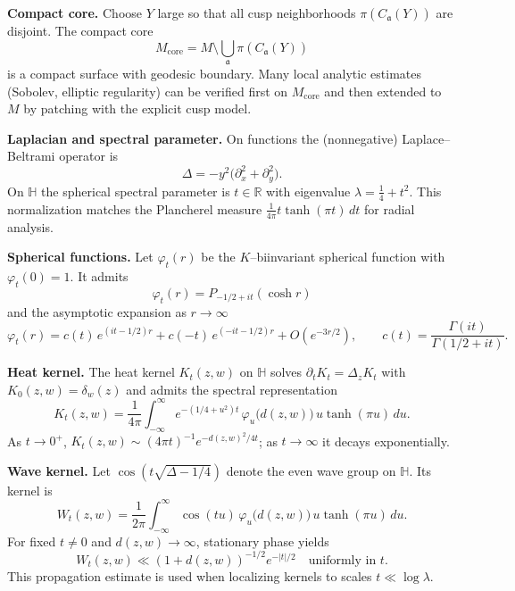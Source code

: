 \medskip

\noindent\textbf{Compact core.}
Choose $Y$ large so that all cusp neighborhoods $\pi(C_{\mathfrak{a}}(Y))$ are disjoint.
The compact core
\[
  M_{\mathrm{core}}=M\setminus\bigcup_{\mathfrak{a}}\pi(C_{\mathfrak{a}}(Y))
\]
is a compact surface with geodesic boundary. Many local analytic estimates
(Sobolev, elliptic regularity) can be verified first on $M_{\mathrm{core}}$ and then extended
to $M$ by patching with the explicit cusp model.


\noindent\textbf{Laplacian and spectral parameter.}
On functions the (nonnegative) Laplace–Beltrami operator is
\[
  \Delta=-y^{2}\bigl(\partial_{x}^{2}+\partial_{y}^{2}\bigr).
\]
On $\mathbb{H}$ the spherical spectral parameter is $t\in\mathbb{R}$ with eigenvalue
$\lambda=\tfrac14+t^{2}$. This normalization matches the Plancherel measure
$\tfrac{1}{4\pi}t\tanh(\pi t)\,dt$ for radial analysis.

\medskip

\noindent\textbf{Spherical functions.}
Let $\varphi_{t}(r)$ be the $K$–biinvariant spherical function with $\varphi_{t}(0)=1$.
It admits
\[
  \varphi_{t}(r)=P_{-1/2+it}(\cosh r)
\]
and the asymptotic expansion as $r\to\infty$
\[
  \varphi_{t}(r)=c(t)\,e^{(it-1/2)r}+c(-t)\,e^{(-it-1/2)r}+O(e^{-3r/2}),
  \qquad
  c(t)=\frac{\Gamma(it)}{\Gamma(1/2+it)}.
\]

\medskip

\noindent\textbf{Heat kernel.}
The heat kernel $K_{t}(z,w)$ on $\mathbb{H}$ solves
$\partial_{t}K_{t}=\Delta_{z}K_{t}$ with $K_{0}(z,w)=\delta_{w}(z)$ and admits the spectral
representation
\[
  K_{t}(z,w)=\frac{1}{4\pi}\int_{-\infty}^{\infty}
  e^{-(1/4+u^{2})t}\,\varphi_{u}\bigl(d(z,w)\bigr)\,u\tanh(\pi u)\,du.
\]
As $t\to 0^{+}$, $K_{t}(z,w)\sim (4\pi t)^{-1} e^{-d(z,w)^{2}/4t}$; as $t\to\infty$ it decays exponentially.

\medskip

\noindent\textbf{Wave kernel.}
Let $\cos(t\sqrt{\Delta-1/4})$ denote the even wave group on $\mathbb{H}$.
Its kernel is
\[
  W_{t}(z,w)=\frac{1}{2\pi}\int_{-\infty}^{\infty}
  \cos(tu)\,\varphi_{u}\bigl(d(z,w)\bigr)\,u\tanh(\pi u)\,du.
\]
For fixed $t\ne 0$ and $d(z,w)\to\infty$, stationary phase yields
\[
  W_{t}(z,w)\ll (1+d(z,w))^{-1/2} e^{-|t|/2}\quad\text{uniformly in }t.
\]
This propagation estimate is used when localizing kernels to scales $t\ll \log\lambda$.

